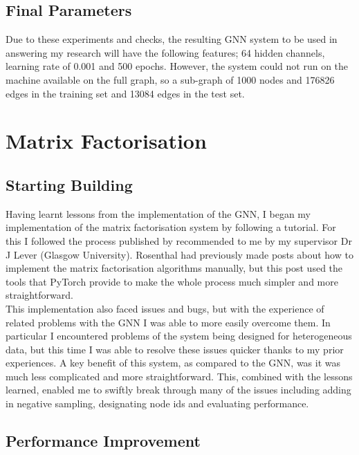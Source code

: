 \documentclass{l4proj}
\begin{document}
\subsection{Final Parameters}

Due to these experiments and checks, the resulting GNN system to be used in answering my research will have the following features; 64 hidden channels, learning rate of 0.001 and 500 epochs. However, the system could not run on the machine available on the full graph, so a sub-graph of 1000 nodes and 176826 edges in the training set and 13084 edges in the test set.\\

\section{Matrix Factorisation}

\subsection{Starting Building}

Having learnt lessons from the implementation of the GNN, I began my implementation of the matrix factorisation system by following a tutorial. For this I followed the process published by \cite{mf_tutorial} recommended to me by my supervisor Dr J Lever (Glasgow University). Rosenthal had previously made posts about how to implement the matrix factorisation algorithms manually, but this post used the tools that PyTorch provide to make the whole process much simpler and more straightforward. \\

This implementation also faced issues and bugs, but with the experience of related problems with the GNN I was able to more easily overcome them. In particular I encountered problems of the system being designed for heterogeneous data, but this time I was able to resolve these issues quicker thanks to my prior experiences. A key benefit of this system, as compared to the GNN, was it was much less complicated and more straightforward. This, combined with the lessons learned, enabled me to swiftly break through many of the issues including adding in negative sampling, designating node ids and evaluating performance. \\

\subsection{Performance Improvement}
\end{document}
